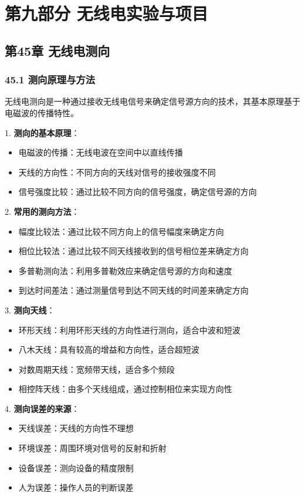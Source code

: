 \documentclass[12pt,UTF8]{ctexbook}
\begin{document}
\part*{第九部分 无线电实验与项目}

\chapter*{第45章 无线电测向}
\section*{45.1 测向原理与方法}

无线电测向是一种通过接收无线电信号来确定信号源方向的技术，其基本原理基于电磁波的传播特性。

1. \textbf{测向的基本原理}：
   \begin{itemize}[leftmargin=3.5em]
   \item 电磁波的传播：无线电波在空间中以直线传播
   \item 天线的方向性：不同方向的天线对信号的接收强度不同
   \item 信号强度比较：通过比较不同方向的信号强度，确定信号源的方向
   \end{itemize}

2. \textbf{常用的测向方法}：
   \begin{itemize}[leftmargin=3.5em]
   \item 幅度比较法：通过比较不同方向上的信号幅度来确定方向
   \item 相位比较法：通过比较不同天线接收到的信号相位差来确定方向
   \item 多普勒测向法：利用多普勒效应来确定信号源的方向和速度
   \item 到达时间差法：通过测量信号到达不同天线的时间差来确定方向
   \end{itemize}

3. \textbf{测向天线}：
   \begin{itemize}[leftmargin=3.5em]
   \item 环形天线：利用环形天线的方向性进行测向，适合中波和短波
   \item 八木天线：具有较高的增益和方向性，适合超短波
   \item 对数周期天线：宽频带天线，适合多个频段
   \item 相控阵天线：由多个天线组成，通过控制相位来实现方向性
   \end{itemize}

4. \textbf{测向误差的来源}：
   \begin{itemize}[leftmargin=3.5em]
   \item 天线误差：天线的方向性不理想
   \item 环境误差：周围环境对信号的反射和折射
   \item 设备误差：测向设备的精度限制
   \item 人为误差：操作人员的判断误差
   \end{itemize}
\end{document}
